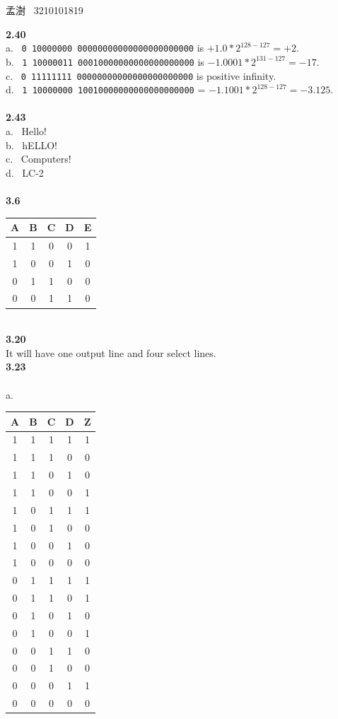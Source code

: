 \documentclass[a4paper,12pt]{article}     %
\begin{document}
\begin{center}   %
孟澍 \ 3210101819
\end{center}

\noindent %
\textbf{2.40}\\
a. \ \verb|0 10000000 00000000000000000000000| is $+1.0 * 2^{128-127} = +2.$\\
b. \ \verb|1 10000011 00010000000000000000000| is $-1.0001 * 2^{131-127} = -17.$\\
c. \ \verb|0 11111111 00000000000000000000000| is positive infinity.\\
d. \ \verb|1 10000000 10010000000000000000000| = $-1.1001 * 2^{128-127} = -3.125.$\\

~\\
\textbf{2.43}\\
a. \ Hello!\\
b. \ hELLO!\\
c. \ Computers!\\
d. \ LC-2\\

~\\
\textbf{3.6}\\
\begin{tabular}{c c|c c c}
  \hline
  A & B & C & D & E \\
  \hline
  1 & 1 & 0 & 0 & 1 \\
  1 & 0 & 0 & 1 & 0 \\
  0 & 1 & 1 & 0 & 0 \\
  0 & 0 & 1 & 1 & 0 \\
  \hline
\end{tabular}

~\\
\textbf{3.20}\\
It will have one output line and four select lines.\\

\newpage
\textbf{3.23}\\
~\\
a. \
\begin{tabular}{c c c c | c}
  \hline
  A & B & C & D & Z \\
  \hline
  1 & 1 & 1 & 1 & 1 \\
  1 & 1 & 1 & 0 & 0 \\
  1 & 1 & 0 & 1 & 0 \\
  1 & 1 & 0 & 0 & 1 \\
  1 & 0 & 1 & 1 & 1 \\
  1 & 0 & 1 & 0 & 0 \\
  1 & 0 & 0 & 1 & 0 \\
  1 & 0 & 0 & 0 & 0 \\
  0 & 1 & 1 & 1 & 1 \\
  0 & 1 & 1 & 0 & 1 \\
  0 & 1 & 0 & 1 & 0 \\
  0 & 1 & 0 & 0 & 1 \\
  0 & 0 & 1 & 1 & 0 \\
  0 & 0 & 1 & 0 & 0 \\
  0 & 0 & 0 & 1 & 1 \\
  0 & 0 & 0 & 0 & 0 \\
  \hline
\end{tabular}\\
\end{document}
